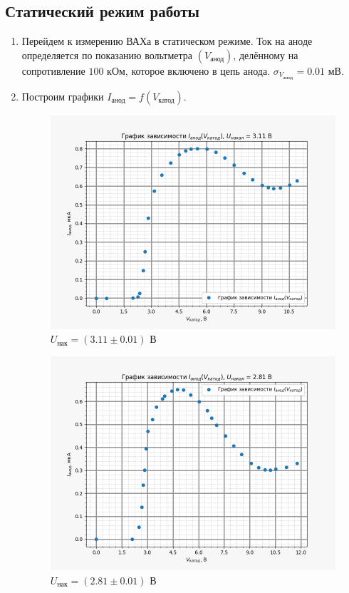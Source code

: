 \subsection*{Статический режим работы}

	\begin{enumerate}
		\item Перейдем к измерению ВАХа в статическом режиме. 
		Ток на аноде определяется по показанию вольтметра $(V_{\text{анод}})$, делённому на сопротивление $100 \text{ кОм}$, которое включено в цепь анода. 
		$\sigma_{V_{\text{анод}}} = 0.01 \text{ мВ}$.
		\item Построим графики $I_{\text{анод}} = f(V_{\text{катод}})$.

		\begin{figure}[H]
			\centering
			\includegraphics[width = 12 cm]{images/U_311}
			\caption{$U_{\text{нак}} = (3.11 \pm 0.01) \text{ В}$}
			\label{U311}
		\end{figure}

		\begin{figure}[H]
			\centering
			\includegraphics[width = 12 cm]{images/U_281}
			\caption{$U_{\text{нак}} = (2.81 \pm 0.01) \text{ В}$}
			\label{U281}
		\end{figure}
	

\end{enumerate}
